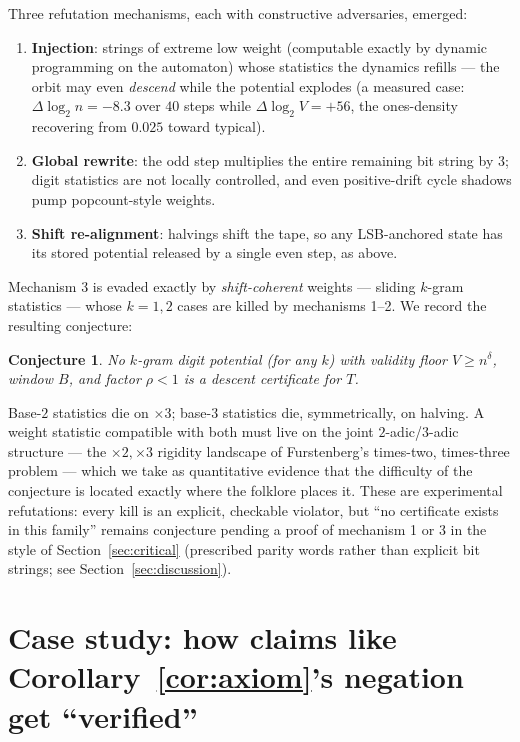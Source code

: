 \documentclass[11pt]{article}
\newtheorem{conjecture}[theorem]{Conjecture}
\begin{document}
Three refutation mechanisms, each with constructive adversaries,
emerged:
\begin{enumerate}
\item \textbf{Injection}: strings of extreme low weight (computable
exactly by dynamic programming on the automaton) whose statistics the
dynamics refills --- the orbit may even \emph{descend} while the
potential explodes (a measured case: $\Delta\log_2 n = -8.3$ over $40$
steps while $\Delta \log_2 V = +56$, the ones-density recovering from
$0.025$ toward typical).
\item \textbf{Global rewrite}: the odd step multiplies the entire
remaining bit string by $3$; digit statistics are not locally
controlled, and even positive-drift cycle shadows pump popcount-style
weights.
\item \textbf{Shift re-alignment}: halvings shift the tape, so any
LSB-anchored state has its stored potential released by a single even
step, as above.
\end{enumerate}
Mechanism 3 is evaded exactly by \emph{shift-coherent} weights ---
sliding $k$-gram statistics --- whose $k = 1, 2$ cases are killed by
mechanisms 1--2. We record the resulting conjecture:

\begin{conjecture}\label{conj:kgram}
No $k$-gram digit potential (for any $k$) with validity floor
$V \ge n^{\delta}$, window $B$, and factor $\rho < 1$ is a descent
certificate for $T$.
\end{conjecture}

Base-$2$ statistics die on $\times 3$; base-$3$ statistics die,
symmetrically, on halving. A weight statistic compatible with both
must live on the joint $2$-adic/$3$-adic structure --- the
$\times 2,\times 3$ rigidity landscape of Furstenberg's times-two,
times-three problem --- which we take as quantitative evidence that
the difficulty of the conjecture is located exactly where the folklore
places it. These are experimental refutations: every kill is an
explicit, checkable violator, but ``no certificate exists in this
family'' remains conjecture pending a proof of mechanism 1 or 3 in the
style of Section~\ref{sec:critical} (prescribed parity words rather
than explicit bit strings; see Section~\ref{sec:discussion}).

\section{Case study: how claims like Corollary~\ref{cor:axiom}'s
negation get ``verified''}
\label{sec:casestudy}
\end{document}

